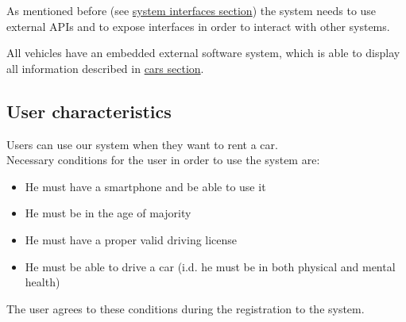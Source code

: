 As mentioned before (see \hyperref[sec:systemInterfaces]{system interfaces section}) the system needs to use external APIs and to expose interfaces in order to interact with other systems.

All vehicles have an embedded external software system, which is able to display all information described in \hyperref[sec:cars]{cars section}.

\subsection{User characteristics}
	Users can use our system when they want to rent a car.\\
	Necessary conditions for the user in order to use the system are:
	\begin{itemize}
		\item He must have a smartphone and be able to use it
		\item He must be in the age of majority
		\item He must have a proper valid driving license
		\item He must be able to drive a car (i.d. he must be in both physical and mental health)
	\end{itemize}
	The user agrees to these conditions during the registration to the system.

